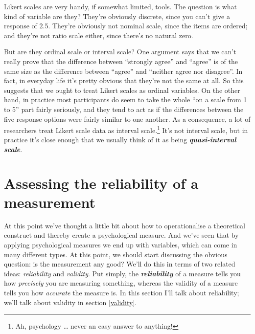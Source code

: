 \documentclass[
]{book}
\begin{document}
Likert scales are very handy, if somewhat limited, tools. The question is what kind of variable are they? They're obviously discrete, since you can't give a response of 2.5. They're obviously not nominal scale, since the items are ordered; and they're not ratio scale either, since there's no natural zero.

But are they ordinal scale or interval scale? One argument says that we can't really prove that the difference between ``strongly agree'' and ``agree'' is of the same size as the difference between ``agree'' and ``neither agree nor disagree''. In fact, in everyday life it's pretty obvious that they're not the same at all. So this suggests that we ought to treat Likert scales as ordinal variables. On the other hand, in practice most participants do seem to take the whole ``on a scale from 1 to 5'' part fairly seriously, and they tend to act as if the differences between the five response options were fairly similar to one another. As a consequence, a lot of researchers treat Likert scale data as interval scale.\footnote{Ah, psychology \ldots{} never an easy answer to anything!} It's not interval scale, but in practice it's close enough that we usually think of it as being \textbf{\emph{quasi-interval scale}}.

\hypertarget{reliability}{%
\section{Assessing the reliability of a measurement}\label{reliability}}

At this point we've thought a little bit about how to operationalise a theoretical construct and thereby create a psychological measure. And we've seen that by applying psychological measures we end up with variables, which can come in many different types. At this point, we should start discussing the obvious question: is the measurement any good? We'll do this in terms of two related ideas: \emph{reliability} and \emph{validity}. Put simply, the \textbf{\emph{reliability}} of a measure tells you how \emph{precisely} you are measuring something, whereas the validity of a measure tells you how \emph{accurate} the measure is. In this section I'll talk about reliability; we'll talk about validity in section \ref{validity}.
\end{document}
